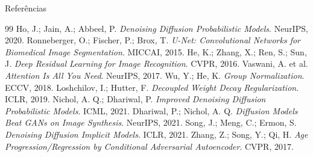 \documentclass[aspectratio=169]{beamer}
\begin{document}
\begin{frame}{Referências}
    \footnotesize
    \begin{thebibliography}{99}
         Ho, J.; Jain, A.; Abbeel, P. \textit{Denoising Diffusion Probabilistic Models}. NeurIPS, 2020.
         Ronneberger, O.; Fischer, P.; Brox, T. \textit{U-Net: Convolutional Networks for Biomedical Image Segmentation}. MICCAI, 2015.
         He, K.; Zhang, X.; Ren, S.; Sun, J. \textit{Deep Residual Learning for Image Recognition}. CVPR, 2016.
         Vaswani, A. et al. \textit{Attention Is All You Need}. NeurIPS, 2017.
         Wu, Y.; He, K. \textit{Group Normalization}. ECCV, 2018.
         Loshchilov, I.; Hutter, F. \textit{Decoupled Weight Decay Regularization}. ICLR, 2019.
         Nichol, A. Q.; Dhariwal, P. \textit{Improved Denoising Diffusion Probabilistic Models}. ICML, 2021.
         Dhariwal, P.; Nichol, A. Q. \textit{Diffusion Models Beat GANs on Image Synthesis}. NeurIPS, 2021.
         Song, J.; Meng, C.; Ermon, S. \textit{Denoising Diffusion Implicit Models}. ICLR, 2021.
         Zhang, Z.; Song, Y.; Qi, H. \textit{Age Progression/Regression by Conditional Adversarial Autoencoder}. CVPR, 2017.
    \end{thebibliography}
\end{frame}
\end{document}

